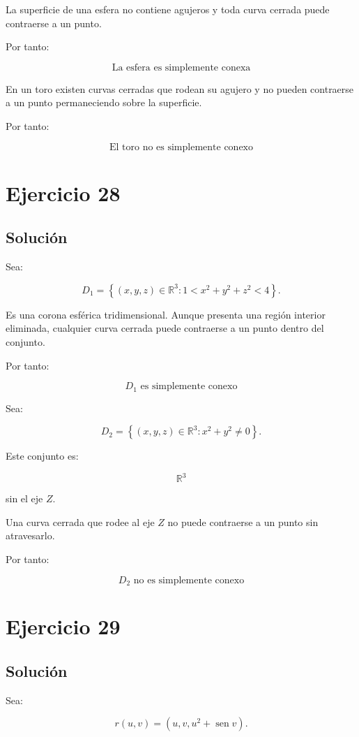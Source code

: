 \documentclass[11pt,a4paper]{article}
\newcommand{\R}{\mathbb{R}}
\newcommand{\sen}{\operatorname{sen}}
\begin{document}
La superficie de una esfera no contiene agujeros y toda curva cerrada puede contraerse a un punto.

Por tanto:

\[
\boxed{
\text{La esfera es simplemente conexa}
}
\]

En un toro existen curvas cerradas que rodean su agujero y no pueden contraerse a un punto permaneciendo sobre la superficie.

Por tanto:

\[
\boxed{
\text{El toro no es simplemente conexo}
}
\]

\section{Ejercicio 28}
\subsection{Solución}

Sea:

\[
D_1
=
\left\{
(x,y,z)\in\R^3:
1<x^2+y^2+z^2<4
\right\}.
\]

Es una corona esférica tridimensional. Aunque presenta una región interior eliminada, cualquier curva cerrada puede contraerse a un punto dentro del conjunto.

Por tanto:

\[
\boxed{
D_1\text{ es simplemente conexo}
}
\]

Sea:

\[
D_2
=
\left\{
(x,y,z)\in\R^3:
x^2+y^2\neq0
\right\}.
\]

Este conjunto es:

\[
\R^3
\]

sin el eje \(Z\).

Una curva cerrada que rodee al eje \(Z\) no puede contraerse a un punto sin atravesarlo.

Por tanto:

\[
\boxed{
D_2\text{ no es simplemente conexo}
}
\]

\section{Ejercicio 29}
\subsection{Solución}

Sea:

\[
r(u,v)
=
(u,v,u^2+\sen v).
\]
\end{document}
